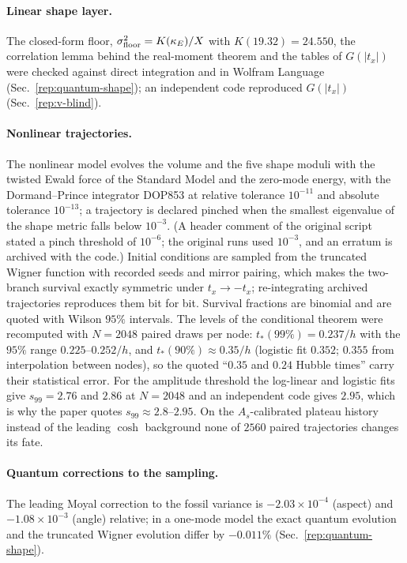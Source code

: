 \paragraph{Linear shape layer.}
The closed-form floor, $\sigma_{\rm floor}^2=K(\kappa_E)/X$ with $K(19.32)=24.550$, the correlation lemma behind the real-moment theorem and the tables of $G(|t_x|)$ were checked against direct integration and in Wolfram Language (Sec.~\ref{rep:quantum-shape}); an independent code reproduced $G(|t_x|)$ (Sec.~\ref{rep:v-blind}). %

\paragraph{Nonlinear trajectories.}
The nonlinear model evolves the volume and the five shape moduli with the twisted Ewald force of the Standard Model and the zero-mode energy, with the Dormand--Prince integrator DOP853 at relative tolerance $10^{-11}$ and absolute tolerance $10^{-13}$; a trajectory is declared pinched when the smallest eigenvalue of the shape metric falls below $10^{-3}$. %
(A header comment of the original script stated a pinch threshold of $10^{-6}$; the original runs used $10^{-3}$, and an erratum is archived with the code.)
Initial conditions are sampled from the truncated Wigner function with recorded seeds and mirror pairing, which makes the two-branch survival exactly symmetric under $t_x\to-t_x$; re-integrating archived trajectories reproduces them bit for bit.
Survival fractions are binomial and are quoted with Wilson $95\%$ intervals.
The levels of the conditional theorem were recomputed with $N=2048$ paired draws per node: $t_*(99\%)=0.237/h$ with the $95\%$ range $0.225$--$0.252/h$, and $t_*(90\%)\approx0.35/h$ (logistic fit $0.352$; $0.355$ from interpolation between nodes), so the quoted ``$0.35$ and $0.24$ Hubble times'' carry their statistical error. %
For the amplitude threshold the log-linear and logistic fits give $s_{99}=2.76$ and $2.86$ at $N=2048$ and an independent code gives $2.95$, which is why the paper quotes $s_{99}\approx2.8$--$2.95$. %
On the $A_s$-calibrated plateau history instead of the leading $\cosh$ background none of $2560$ paired trajectories changes its fate. %

\paragraph{Quantum corrections to the sampling.}
The leading Moyal correction to the fossil variance is $-2.03\times10^{-4}$ (aspect) and $-1.08\times10^{-3}$ (angle) relative; in a one-mode model the exact quantum evolution and the truncated Wigner evolution differ by $-0.011\%$ (Sec.~\ref{rep:quantum-shape}). %

